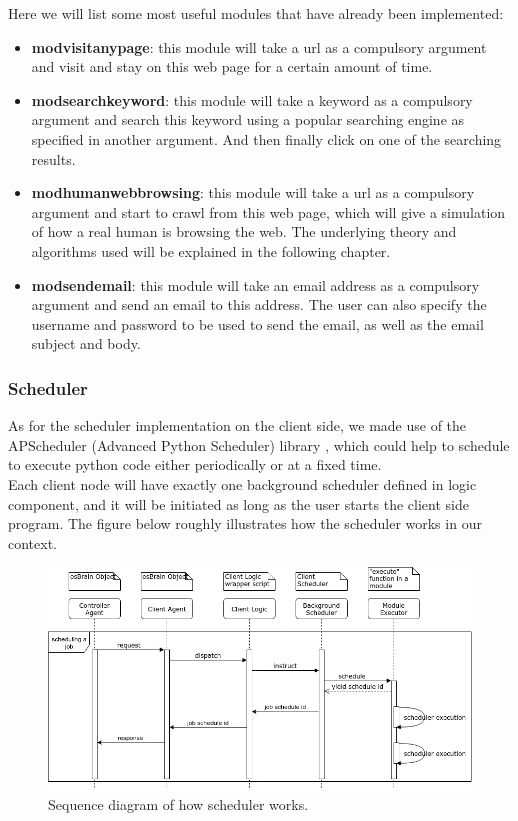 \documentclass[12pt]{report}
\begin{document}
Here we will list some most useful modules that have already been implemented:
\begin{itemize}
\item \textbf{mod\textunderscore visit\textunderscore any\textunderscore page}: this module will take a url as a compulsory argument and visit and stay on this web page for a certain amount of time.
\item \textbf{mod\textunderscore search\textunderscore key\textunderscore word}: this module will take a keyword as a compulsory argument and search this keyword using a popular searching engine as specified in another argument. And then finally click on one of the searching results.
\item \textbf{mod\textunderscore human\textunderscore web\textunderscore browsing}: this module will take a url as a compulsory argument and start to crawl from this web page, which will give a simulation of how a real human is browsing the web. The underlying theory and algorithms used will be explained in the following chapter.
\item \textbf{mod\textunderscore send\textunderscore email}: this module will take an email address as a compulsory argument and send an email to this address. The user can also specify the username and password to be used to send the email, as well as the email subject and body.
\end{itemize}


\subsubsection{Scheduler}
As for the scheduler implementation on the client side, we made use of the APScheduler (Advanced Python Scheduler) library \citep{APScheduler}, which could help to schedule to execute python code either periodically or at a fixed time.\\

Each client node will have exactly one background scheduler defined in logic component, and it will be initiated as long as the user starts the client side program. The figure below roughly illustrates how the scheduler works in our context.\\

\begin{figure}[h!]
	\centering
	\includegraphics[width=1\textwidth]{./pictures/scheduler-uml}
	\caption{Sequence diagram of how scheduler works.}
\end{figure}
\end{document}

